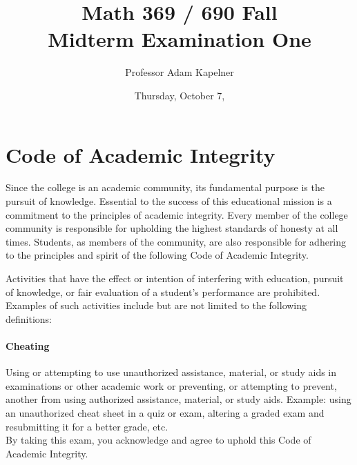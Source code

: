\documentclass[12pt,landscape]{article}
\title{Math 369 / 690 Fall \the\year{} \\ Midterm Examination One}
\author{Professor Adam Kapelner}
\date{Thursday, October 7, \the\year{}}
\begin{document}
\maketitle


\thispagestyle{empty}

\section*{Code of Academic Integrity}

\footnotesize
Since the college is an academic community, its fundamental purpose is the pursuit of knowledge. Essential to the success of this educational mission is a commitment to the principles of academic integrity. Every member of the college community is responsible for upholding the highest standards of honesty at all times. Students, as members of the community, are also responsible for adhering to the principles and spirit of the following Code of Academic Integrity.

Activities that have the effect or intention of interfering with education, pursuit of knowledge, or fair evaluation of a student's performance are prohibited. Examples of such activities include but are not limited to the following definitions:

\paragraph{Cheating} Using or attempting to use unauthorized assistance, material, or study aids in examinations or other academic work or preventing, or attempting to prevent, another from using authorized assistance, material, or study aids. Example: using an unauthorized cheat sheet in a quiz or exam, altering a graded exam and resubmitting it for a better grade, etc.
\\

\noindent By taking this exam, you acknowledge and agree to uphold this Code of Academic Integrity. \\


\normalsize
\end{document}

